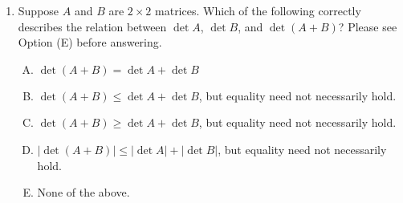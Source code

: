 \documentclass[10pt]{amsart}
\begin{document}
\begin{enumerate}
  {\em Answer}: Option (C)

  {\em Explanation}: The identity matrix is not similar to any
  non-identity matrix, because it is scalar, so conjugating it by
  anything leaves it as it is.

  All other pairs of matrices are in fact similar:

  \begin{itemize}
  \item Option (A): We can use the coordinate interchange matrix
    $\left[\begin{matrix} 0 & 1 \\ 1 & 0 \\\end{matrix}\right]$.
  \item Option (B): We can use the conjugating matrix $\left[\begin{matrix} 1 & 1 \\ 1 & -1 \\\end{matrix}\right]$.
  \item Option (D) We can use the coordinate interchange matrix $\left[\begin{matrix} 0 & 1 \\ 1 & 0 \\\end{matrix}\right]$.
  \item Option (E): Use $\left[\begin{matrix} 1 & 0 \\ 0 & 2
      \\\end{matrix}\right]$.
  \end{itemize}

  {\em Performance review}: 10 out of 25 got this. 7 chose (B), 5
  chose (E), 2 chose (D), 1 left the question blank.

  {\em Historical note (last time)}: $6$ out of $19$ got this. $5$ chose (B),
  $3$ each chose (D) and (E), and $2$ chose (A).

\item Suppose $A$ and $B$ are $2 \times 2$ matrices. Which of the
  following correctly describes the relation between $\det A$, $\det
  B$, and $\det (A + B)$? Please see Option (E) before answering.

  \begin{enumerate}[(A)]
  \item $\det(A + B) = \det A + \det B$
  \item $\det(A + B) \le \det A + \det B$, but equality need not
    necessarily hold.
  \item $\det(A + B) \ge \det A + \det B$, but equality need not
    necessarily hold.
  \item $|\det(A + B)| \le |\det A| + |\det B|$, but equality need not
    necessarily hold.
  \item None of the above.
  \end{enumerate}


\end{enumerate}
\end{document}

